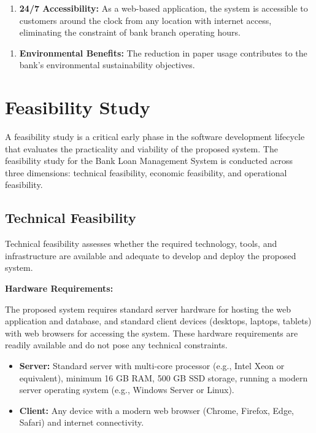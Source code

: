 \documentclass[12pt,a4paper,oneside]{report}
\begin{document}
\begin{enumerate}
  \item \textbf{24/7 Accessibility:} As a web-based application, the system is accessible to customers around the clock from any location with internet access, eliminating the constraint of bank branch operating hours.
\end{enumerate}

\begin{enumerate}
  \item \textbf{Environmental Benefits:} The reduction in paper usage contributes to the bank's environmental sustainability objectives.
\end{enumerate}

\section{Feasibility Study}

A feasibility study is a critical early phase in the software development lifecycle that evaluates the practicality and viability of the proposed system. The feasibility study for the Bank Loan Management System is conducted across three dimensions: technical feasibility, economic feasibility, and operational feasibility.

\subsection{Technical Feasibility}

Technical feasibility assesses whether the required technology, tools, and infrastructure are available and adequate to develop and deploy the proposed system.

\textbf{Hardware Requirements:}

The proposed system requires standard server hardware for hosting the web application and database, and standard client devices (desktops, laptops, tablets) with web browsers for accessing the system. These hardware requirements are readily available and do not pose any technical constraints.

\begin{itemize}
  \item \textbf{Server:} Standard server with multi-core processor (e.g., Intel Xeon or equivalent), minimum 16 GB RAM, 500 GB SSD storage, running a modern server operating system (e.g., Windows Server or Linux).
  \item \textbf{Client:} Any device with a modern web browser (Chrome, Firefox, Edge, Safari) and internet connectivity.
\end{itemize}
\end{document}
